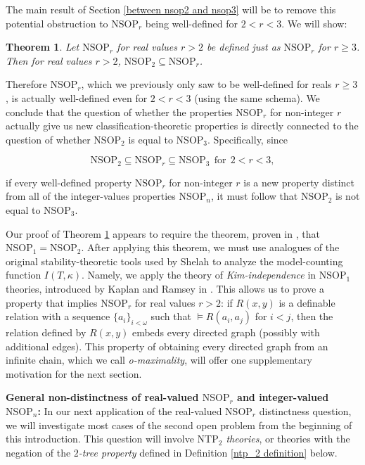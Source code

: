 \documentclass{amsart}
\newtheorem{theorem}{Theorem}[section]
\theoremstyle{definition}
\theoremstyle{remark}
\numberwithin{equation}{section}
\begin{document}
The main result of Section \ref{between nsop2 and nsop3} will be to remove this potential obstruction to $\mathrm{NSOP}_{r}$ being well-defined for $2 < r < 3$. We will show:
\begin{theorem}\label{main theorem 1}
    Let $\mathrm{NSOP}_{r}$ for real values $r > 2$ be defined just as $\mathrm{NSOP}_{r}$ for $r \geq 3$. Then for real values $r > 2$, $\mathrm{NSOP}_{2} \subseteq \mathrm{NSOP}_{r}$.
\end{theorem}
Therefore $\mathrm{NSOP}_{r}$, which we previously only saw to be well-defined for reals $r \geq 3$, is actually well-defined even for $2 < r < 3$ (using the same schema). We conclude that the question of whether the properties $\mathrm{NSOP}_{r}$ for non-integer $r$ actually give us new classification-theoretic properties is directly connected to the question of whether $\mathrm{NSOP}_{2}$ is equal to $\mathrm{NSOP}_{3}$. Specifically, since 

$$\mathrm{NSOP}_{2} \subseteq \mathrm{NSOP}_{r} \subseteq \mathrm{NSOP}_{3} \mathrm{\: \: for \: \:} 2< r< 3,$$ 

if every well-defined property $\mathrm{NSOP}_{r}$ for non-integer $r$ is a new property distinct from all of the integer-values properties $\mathrm{NSOP}_{n}$, it must follow that $\mathrm{NSOP}_{2}$ is not equal to $\mathrm{NSOP}_{3}$.

Our proof of Theorem \ref{main theorem 1} appears to require the theorem, proven in \cite{NSOP2}, that $\mathrm{NSOP}_{1} = \mathrm{NSOP}_{2}$. After applying this theorem, we must use analogues of the original stability-theoretic tools used by Shelah to analyze the model-counting function $I(T, \kappa)$. Namely, we apply the theory of \textit{Kim-independence} in $\mathrm{NSOP}_{1}$ theories, introduced by Kaplan and Ramsey in \cite{KR17}. This allows us to prove a property that implies $\mathrm{NSOP}_{r}$ for real values $r > 2$: if $R(x, y)$ is a definable relation with a sequence $\{a_{i}\}_{i< \omega}$ such that $\models R(a_{i}, a_{j})$ for $i < j$, then the relation defined by $R(x, y)$ embeds every directed graph (possibly with additional edges). This property of obtaining every directed graph from an infinite chain, which we call \textit{o-maximality}, will offer one supplementary motivation for the next section.

\:


\textbf{General non-distinctness of real-valued $\mathrm{NSOP}_{r}$ and integer-valued $\mathrm{NSOP}_{n}$:}  In our next application of the real-valued $\mathrm{NSOP}_{r}$ distinctness question, we will investigate most cases of the second open problem from the beginning of this introduction. This question will involve \textit{$\mathrm{NTP}_{2}$ theories}, or theories with the negation of the \textit{$2$-tree property} defined in Definition \ref{ntp_2 definition} below.
\end{document}
